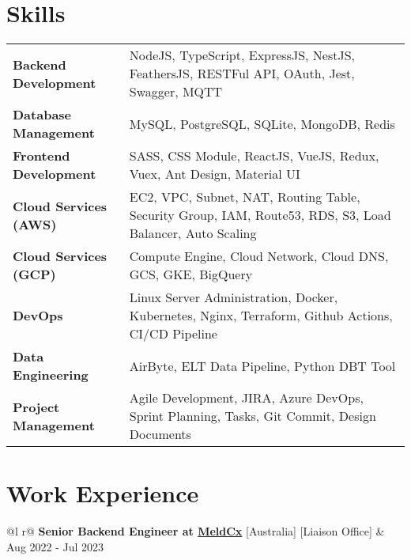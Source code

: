 \documentclass {article}
\begin{document}
\section{Skills}
\begin{tabularx}{\linewidth}{@{}l X@{}}
  \textbf{Backend Development} & NodeJS, TypeScript, ExpressJS, NestJS, FeathersJS, RESTFul API, OAuth, Jest, Swagger, MQTT\\
  \textbf{Database Management} & MySQL, PostgreSQL, SQLite, MongoDB, Redis\\ 
  \textbf{Frontend Development} & SASS, CSS Module, ReactJS, VueJS, Redux, Vuex, Ant Design, Material UI\\ 
  \textbf{Cloud Services (AWS)} & EC2, VPC, Subnet, NAT, Routing Table, Security Group, IAM, Route53, RDS, S3, Load Balancer, Auto Scaling\\ 
  \textbf{Cloud Services (GCP)} & Compute Engine, Cloud Network, Cloud DNS, GCS, GKE, BigQuery\\
  \textbf{DevOps} & Linux Server Administration, Docker, Kubernetes, Nginx,  Terraform, Github Actions, CI/CD Pipeline\\
  \textbf{Data Engineering} & AirByte, ELT Data Pipeline, Python DBT Tool\\
  \textbf{Project Management} & Agile Development, JIRA, Azure DevOps, Sprint Planning, Tasks, Git Commit, Design Documents\\
\end{tabularx}

\section{Work Experience}

\begin{tabularx}{\linewidth}{ @{}l r@{} }
\textbf{Senior Backend Engineer at \href{https://www.meldcx.com/}{MeldCx}} [Australia] [Liaison Office] & \hfill Aug 2022 - Jul 2023 \\[3.75pt]
\end{tabularx}
\end{document}
